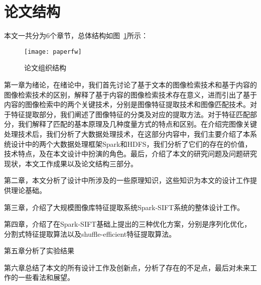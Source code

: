 \section{论文结构}
本文一共分为6个章节，总体结构如图~\ref{fig:paperfw}所示：
\begin{figure}[htp]
\centering
\texttt{[image: paperfw]}
\caption{论文组织结构}
\label{fig:paperfw}
\end{figure}

第一章为绪论，在绪论中，我们首先讨论了基于文本的图像检索技术和基于内容的图像检索技术的区别，解释了基于内容的图像检索技术存在意义，进而引出了基于内容的图像检索中的两个关键技术，分别是图像特征提取技术和图像匹配技术。对于特征提取部分，我们阐述了图像特征的分类及对应的提取方法。对于特征匹配部分，我们解释了匹配的基本原理及几种度量方式的特点和区别。在介绍完图像关键处理技术后，我们分析了大数据处理技术，在这部分内容中，我们主要介绍了本系统设计中的两个大数据处理框架Spark和HDFS，我们分析了它们的存在的价值，技术特点，及在本文设计中扮演的角色。最后，介绍了本文的研究问题及问题研究现状，本文工作成果以及论文结构三部分。

第二章，本文分析了设计中所涉及的一些原理知识，这些知识为本文的设计工作提供理论基础。

第三章，介绍了大规模图像库特征提取系统Spark-SIFT系统的整体设计工作。

第四章，介绍了在Spark-SIFT基础上提出的三种优化方案，分别是序列化优化，分割式特征提取算法以及shuffle-efficient特征提取算法。

第五章分析了实验结果

第六章总结了本文的所有设计工作及创新点，分析了存在的不足点，最后对未来工作的一些看法和展望。



